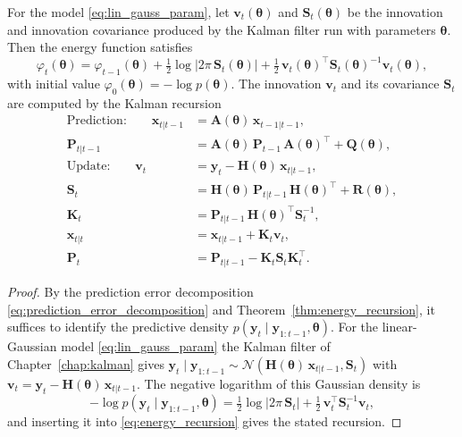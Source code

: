\begin{theorem}\label{thm:energy_linear_gaussian}
For the model \eqref{eq:lin_gauss_param}, let $\mathbf{v}_t(\boldsymbol{\theta})$ and $\mathbf{S}_t(\boldsymbol{\theta})$ be the innovation and innovation covariance produced by the Kalman filter run with parameters $\boldsymbol{\theta}$. Then the energy function satisfies
\begin{equation}\label{eq:energy_linear_gaussian}
    \varphi_t(\boldsymbol{\theta}) = \varphi_{t-1}(\boldsymbol{\theta}) + \tfrac{1}{2}\log\bigl|2\pi\,\mathbf{S}_t(\boldsymbol{\theta})\bigr| + \tfrac{1}{2}\,\mathbf{v}_t(\boldsymbol{\theta})^\top \mathbf{S}_t(\boldsymbol{\theta})^{-1} \mathbf{v}_t(\boldsymbol{\theta}),
\end{equation}
with initial value $\varphi_0(\boldsymbol{\theta}) = -\log p(\boldsymbol{\theta})$. The innovation $\mathbf{v}_t$ and its covariance $\mathbf{S}_t$ are computed by the Kalman recursion
\begin{align*}
    \text{Prediction:} \qquad
    \mathbf{x}_{t|t-1} &= \mathbf{A}(\boldsymbol{\theta})\,\mathbf{x}_{t-1|t-1}, \\
    \mathbf{P}_{t|t-1} &= \mathbf{A}(\boldsymbol{\theta})\,\mathbf{P}_{t-1}\,\mathbf{A}(\boldsymbol{\theta})^\top + \mathbf{Q}(\boldsymbol{\theta}), \\[2pt]
    \text{Update:} \qquad
    \mathbf{v}_t &= \mathbf{y}_t - \mathbf{H}(\boldsymbol{\theta})\,\mathbf{x}_{t|t-1}, \\
    \mathbf{S}_t &= \mathbf{H}(\boldsymbol{\theta})\,\mathbf{P}_{t|t-1}\,\mathbf{H}(\boldsymbol{\theta})^\top + \mathbf{R}(\boldsymbol{\theta}), \\
    \mathbf{K}_t &= \mathbf{P}_{t|t-1}\,\mathbf{H}(\boldsymbol{\theta})^\top \mathbf{S}_t^{-1}, \\
    \mathbf{x}_{t|t} &= \mathbf{x}_{t|t-1} + \mathbf{K}_t \mathbf{v}_t, \\
    \mathbf{P}_t &= \mathbf{P}_{t|t-1} - \mathbf{K}_t \mathbf{S}_t \mathbf{K}_t^\top.
\end{align*}
\end{theorem}

\begin{proof}
By the prediction error decomposition \eqref{eq:prediction_error_decomposition} and Theorem~\ref{thm:energy_recursion}, it suffices to identify the predictive density $p(\mathbf{y}_t \mid \mathbf{y}_{1:t-1}, \boldsymbol{\theta})$. For the linear-Gaussian model \eqref{eq:lin_gauss_param} the Kalman filter of Chapter~\ref{chap:kalman} gives $\mathbf{y}_t \mid \mathbf{y}_{1:t-1} \sim \mathcal{N}(\mathbf{H}(\boldsymbol{\theta})\,\mathbf{x}_{t|t-1}, \mathbf{S}_t)$ with $\mathbf{v}_t = \mathbf{y}_t - \mathbf{H}(\boldsymbol{\theta})\,\mathbf{x}_{t|t-1}$. The negative logarithm of this Gaussian density is
\[
    -\log p(\mathbf{y}_t \mid \mathbf{y}_{1:t-1}, \boldsymbol{\theta})
    = \tfrac{1}{2}\log\bigl|2\pi\,\mathbf{S}_t\bigr| + \tfrac{1}{2}\,\mathbf{v}_t^\top \mathbf{S}_t^{-1} \mathbf{v}_t,
\]
and inserting it into \eqref{eq:energy_recursion} gives the stated recursion.
\end{proof}

